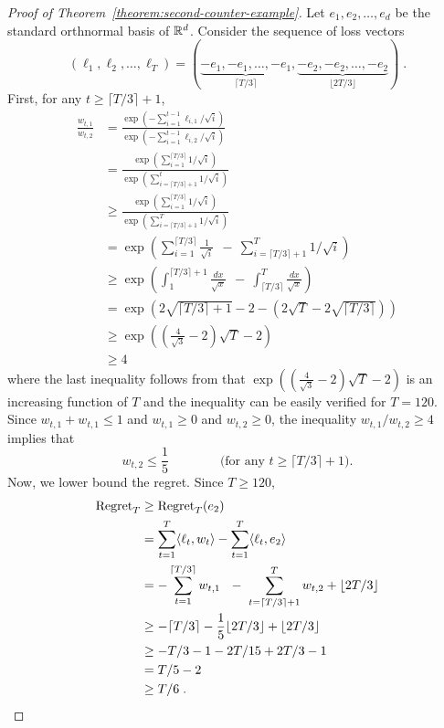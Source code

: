 \begin{proof}[Proof of Theorem~\ref{theorem:second-counter-example}]
Let $e_1, e_2, \dots, e_d$ be the standard orthnormal basis of $\mathbb{R}^d$. Consider
the sequence of loss vectors
$$
(\ell_1, \ell_2, \dots, \ell_T) = ( \underbrace{-e_1, -e_1, \dots, -e_1}_{\lceil T/3 \rceil}, \underbrace{-e_2, -e_2, \dots, -e_2}_{\lfloor 2T/3 \rfloor}) \; .
$$
First, for any $t \ge \lceil T/3 \rceil + 1$,
\begin{align*}
\frac{w_{t,1}}{w_{t,2}}
& = \frac{\exp(-\sum_{i=1}^{t-1} \ell_{i,1}/\sqrt{i})}{\exp(-\sum_{i=1}^{t-1} \ell_{i,2}/\sqrt{i})} \\
& = \frac{\exp(\sum_{i=1}^{\lceil T/3 \rceil} 1/\sqrt{i})}{\exp(\sum_{i=\lceil T/3 \rceil + 1}^t 1/\sqrt{i})} \\
& \ge \frac{\exp(\sum_{i=1}^{\lceil T/3 \rceil} 1/\sqrt{i})}{\exp(\sum_{i=\lceil T/3 \rceil + 1}^T 1/\sqrt{i})} \\
& = \exp\left(\sum_{i=1}^{\lceil T/3 \rceil} \frac{1}{\sqrt{i}} \ \ - \ \sum_{i=\lceil T/3 \rceil + 1}^T 1/\sqrt{i} \right) \\
& \ge \exp\left( \int_{1}^{\lceil T/3 \rceil + 1} \frac{dx}{\sqrt{x}} \ \ - \ \int_{\lceil T/3 \rceil}^T \frac{dx}{\sqrt{x}} \right) \\
& = \exp\left( 2\sqrt{\lceil T/3 \rceil + 1} - 2 - (2\sqrt{T} - 2 \sqrt{\lceil T/3 \rceil}) \right) \\
& \ge \exp\left( \left( \frac{4}{\sqrt{3}} - 2 \right) \sqrt{T} - 2 \right) \\
& \ge 4
\end{align*}
where the last inequality follows from that $\exp\left( \left(
\frac{4}{\sqrt{3}} - 2 \right) \sqrt{T} - 2 \right)$ is an increasing function
of $T$ and the inequality can be easily verified for $T=120$. Since $w_{t,1} +
w_{t,1} \le 1$ and $w_{t,1} \ge 0$ and $w_{t,2} \ge 0$, the inequality
$w_{t,1}/w_{t,2} \ge 4$ implies that
$$
w_{t,2} \le \frac{1}{5} \qquad \qquad \text{(for any $t \ge \lceil T/3 \rceil + 1$)}.
$$
Now, we lower bound the regret. Since $T \ge 120$,
\begin{align*}
\operatorname{Regret}_T
& \ge \operatorname{Regret}_T(e_2) \\
& = \sum_{t=1}^T \langle \ell_t, w_t \rangle - \sum_{t=1}^T \langle \ell_t, e_2 \rangle \\
& = - \sum_{t=1}^{\lceil T/3 \rceil} w_{t,1} \ \ - \ \sum_{t=\lceil T/3 \rceil + 1}^T w_{t,2}  +  \lfloor 2T/3 \rfloor \\
& \ge - \lceil T/3 \rceil - \frac{1}{5} \lfloor 2T/3 \rfloor  +  \lfloor 2T/3 \rfloor \\
& \ge - T/3 - 1 - 2T/15 + 2T/3 - 1 \\
& = T/5 - 2 \\
& \ge T/6 \; .
\end{align*}
\end{proof}
